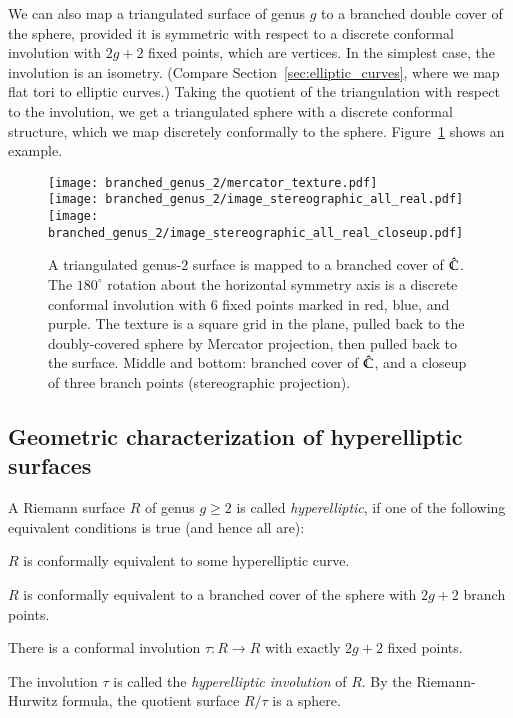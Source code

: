 \documentclass[Thesis]{subfiles}
\begin{document}
 We
can also map a triangulated surface of genus $g$ to a branched double
cover of the sphere, provided it is symmetric with respect to a
discrete conformal involution with $2g+2$ fixed points, which are
vertices. In the simplest case, the involution is an
isometry. (Compare Section~\ref{sec:elliptic_curves}, where we map
flat tori to elliptic curves.) Taking the quotient of the triangulation
with respect to the involution, we get a triangulated sphere with a
discrete conformal structure, which we map discretely conformally to
the sphere.  Figure~\ref{fig:genus2_branched} shows an example.
\begin{figure} 
\centering
\texttt{[image: branched\_genus\_2/mercator\_texture.pdf]}\\
\texttt{[image: branched\_genus\_2/image\_stereographic\_all\_real.pdf]}\\
\vspace{1mm}
\texttt{[image: branched\_genus\_2/image\_stereographic\_all\_real\_closeup.pdf]}
\caption{A triangulated genus-$2$ surface is mapped to a branched
  cover of $\hat{\mathbb C}$. The $180^{\circ}$ rotation about the horizontal
  symmetry axis is a discrete conformal involution with $6$ fixed
  points marked in red, blue, and purple. The texture is a
  square grid in the plane, pulled back to the doubly-covered sphere
  by Mercator projection, then pulled back to the surface. Middle and bottom:
  branched cover of $\hat{\mathbb C}$, and a closeup of three branch points (stereographic projection).}
\label{fig:genus2_branched} 
\end{figure}

\subsection{Geometric characterization of hyperelliptic surfaces}
\label{sec:hyperelliptic_domain}

A Riemann surface $R$ of genus $g\geq 2$ is called \emph{hyperelliptic},
if one of the following equivalent conditions is true (and hence all are):
\begin{compactenum}[(i)]
\item $R$ is conformally equivalent to some hyperelliptic curve.
\item $R$ is conformally equivalent to a branched cover of the sphere
  with $2g+2$ branch points.
\item There is a conformal involution $\tau:R\rightarrow R$ with
  exactly $2g+2$ fixed points. 
\end{compactenum}
The involution $\tau$ is called the \emph{hyperelliptic involution} of
$R$. By the Riemann-Hurwitz formula, the quotient surface $R/\tau$ is a
sphere. 
\end{document}
